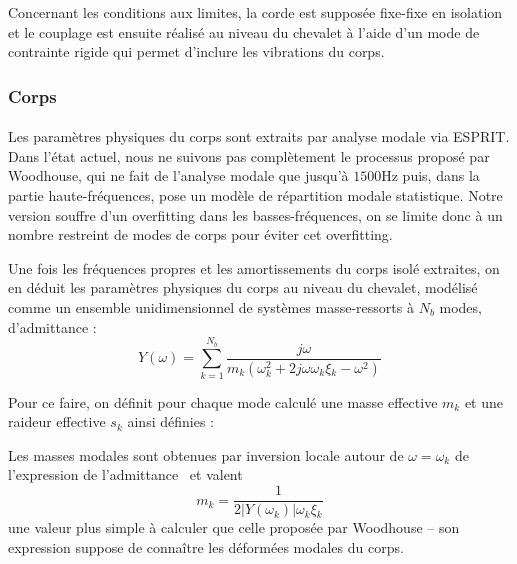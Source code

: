 \documentclass[a4paper,10pt]{article}
\begin{document}

  Concernant les conditions aux limites, la corde est supposée fixe-fixe
en isolation et le couplage est ensuite réalisé au niveau du chevalet à l'aide
d'un mode de contrainte rigide qui permet d'inclure les vibrations du corps.

\subsubsection{Corps}

  \paragraph{}
  Les paramètres physiques du corps sont extraits par analyse modale via ESPRIT.
Dans l'état actuel, nous ne suivons pas complètement le processus proposé par
Woodhouse, qui ne fait de l'analyse modale que jusqu'à \( \si{1500\hertz} \)
puis, dans la partie haute-fréquences, pose un modèle de répartition modale
statistique.
Notre version souffre d'un overfitting dans les basses-fréquences, on se limite
donc à un nombre restreint de modes de corps pour éviter cet overfitting.

  Une fois les fréquences propres et les amortissements du corps isolé
extraites, on en déduit les paramètres physiques du corps au niveau du
chevalet, modélisé comme un ensemble unidimensionnel de systèmes masse-ressorts
à \( N_b \) modes, d'admittance :
  \[ Y(\omega) = \sum_{k=1}^{N_b} \frac{j\omega{}}
    {m_k(\omega_k^2 + 2 j \omega{} \omega{}_k \xi{}_k - \omega{}^2)} \]
    
Pour ce faire, on définit pour chaque mode calculé une masse effective
\( m_k \) et une raideur effective \( s_k \) ainsi définies :

  Les masses modales sont obtenues par inversion locale autour de
\( \omega = \omega_k \) de l'expression de l'admittance~\cite{pate14:phd} et
valent \[ m_k = \frac{1}{2 |Y(\omega_k)| \omega{}_k \xi{}_k} \] une valeur plus
simple à calculer que celle proposée par Woodhouse -- son expression suppose de
connaître les déformées modales du corps.
\end{document}
